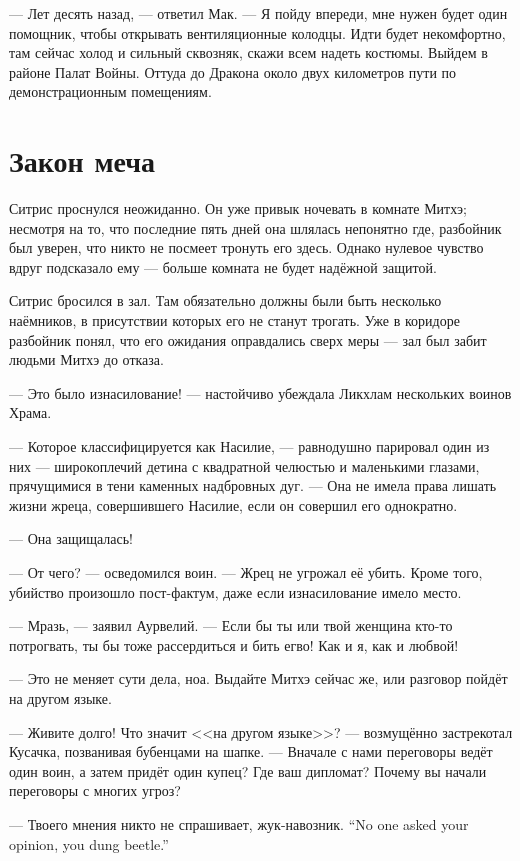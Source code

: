 --- Лет десять назад, --- ответил Мак.
--- Я пойду впереди, мне нужен будет один помощник, чтобы открывать вентиляционные колодцы.
Идти будет некомфортно, там сейчас холод и сильный сквозняк, скажи всем надеть костюмы.
Выйдем в районе Палат Войны.
Оттуда до Дракона около двух километров пути по демонстрационным помещениям.

\section{Закон меча}

Ситрис проснулся неожиданно.
Он уже привык ночевать в комнате Митхэ;
несмотря на то, что последние пять дней она шлялась непонятно где, разбойник был уверен, что никто не посмеет тронуть его здесь.
Однако нулевое чувство вдруг подсказало ему --- больше комната не будет надёжной защитой.

Ситрис бросился в зал.
Там обязательно должны были быть несколько наёмников, в присутствии которых его не станут трогать.
Уже в коридоре разбойник понял, что его ожидания оправдались сверх меры --- зал был забит людьми Митхэ до отказа.

--- Это было изнасилование! --- настойчиво убеждала Ликхлам нескольких воинов Храма.

--- Которое классифицируется как Насилие, --- равнодушно парировал один из них --- широкоплечий детина с квадратной челюстью и маленькими глазами, прячущимися в тени
каменных надбровных дуг.
--- Она не имела права лишать жизни жреца, совершившего Насилие, если он совершил его однократно.

--- Она защищалась!

--- От чего? --- осведомился воин.
--- Жрец не угрожал её убить.
Кроме того, убийство произошло пост-фактум, даже если изнасилование имело место.

--- Мразь, --- заявил Аурвелий.
--- Если бы ты или твой женщина кто-то потрогвать, ты бы тоже рассердиться и бить егво!
Как и я, как и любвой!

--- Это не меняет сути дела, ноа.
Выдайте Митхэ сейчас же, или разговор пойдёт на другом языке.

--- Живите долго!
Что значит <<на другом языке>>? --- возмущённо застрекотал Кусачка, позванивая бубенцами на шапке.
--- Вначале с нами переговоры ведёт один воин, а затем придёт один купец?
Где ваш дипломат?
Почему вы начали переговоры с многих угроз?

{--- Твоего мнения никто не спрашивает, жук-навозник.}
{``No one asked your opinion, you dung beetle.''}

